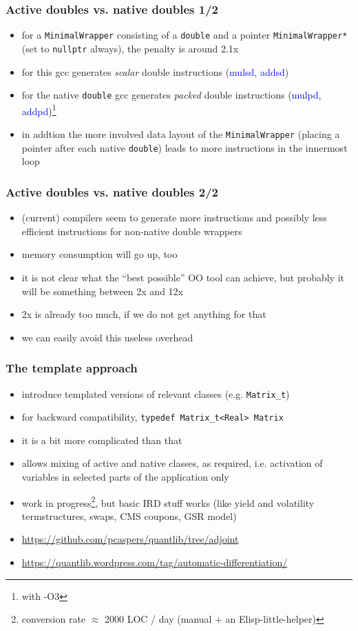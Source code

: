 \documentclass[10pt,German]{beamer}
\begin{document}
\begin{frame}[fragile]
\frametitle{Active doubles vs. native doubles 1/2}
\begin{itemize}
\item for a \verb+MinimalWrapper+ consisting of a \verb+double+ and a pointer \verb+MinimalWrapper*+ (set to \verb+nullptr+ always), the penalty is around 2.1x
\item for this gcc generates \textit{scalar} double instructions (\textcolor{blue}{mulsd}, \textcolor{blue}{addsd})
\item for the native \verb+double+ gcc generates \textit{packed} double instructions (\textcolor{blue}{mulpd}, \textcolor{blue}{addpd})\footnote{with -O3}
\item in addtion the more involved data layout of the \verb+MinimalWrapper+ (placing a pointer after each native \verb+double+) leads to more instructions in the innermost loop
\end{itemize}
\end{frame}

\begin{frame}[fragile]
\frametitle{Active doubles vs. native doubles 2/2}
\begin{itemize}
\item (current) compilers seem to generate more instructions and possibly less efficient instructions for non-native double wrappers
\item memory consumption will go up, too
\item it is not clear what the ``best possible'' OO tool can achieve, but probably it will be something between 2x and 12x
\item 2x is already too much, if we do not get anything for that
\item we can easily avoid this useless overhead
\end{itemize}
\end{frame}

\begin{frame}[fragile]
\frametitle{The template approach}
\begin{itemize}
\item introduce templated versions of relevant classes (e.g. \footnotesize\verb+Matrix_t+\normalsize)
\item for backward compatibility, \footnotesize\verb+typedef Matrix_t<Real> Matrix+\normalsize
\item it is a bit more complicated than that
\item allows mixing of active and native classes, as required, i.e. activation of variables in selected parts of the application only
\item work in progress\footnote{conversion rate $\approx$ 2000 LOC / day (manual + an Elisp-little-helper)}, but basic IRD stuff works (like yield and volatility termstructures, swaps, CMS coupons, GSR model)
\item \tiny \url{https://github.com/pcaspers/quantlib/tree/adjoint}
\item \tiny \url{https://quantlib.wordpress.com/tag/automatic-differentiation/}
\end{itemize}
\end{frame}
\end{document}

